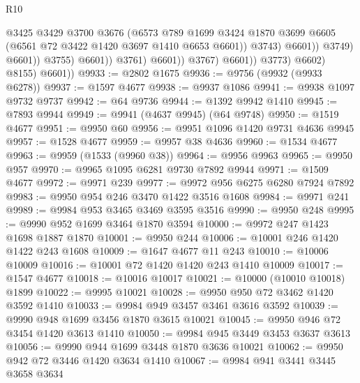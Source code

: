 \begin{lexlean}{R10}
\begin{coremodule}
                                            @3425
                                            @3429
                                            @3700
                                            @3676
                                            (@6573
                                              @789
                                              @1699
                                              @3424
                                              @1870
                                              @3699
                                              @6605
                                              (@6561 @72 @3422 @1420 @3697 @1410 @6653 @6601))
                                            @3743)
                                          @6601))
                                      @3749)
                                    @6601))
                                @3755)
                              @6601))
                          @3761)
                        @6601))
                    @3767)
                  @6601))
              @3773)
            @6602)
          @8155)
        @6601))
@9933 := @2802 @1675
@9936 := @9756 (@9932 (@9933 @6278))
@9937 := @1597 @4677
@9938 := @9937 @1086
@9941 := @9938 @1097 @9732 @9737
@9942 := @64 @9736
@9944 := @1392 @9942 @1410
@9945 := @7893 @9944
@9949 := @9941 (@4637 @9945) (@64 @9748)
@9950 := @1519 @4677
@9951 := @9950 @60
@9956 := @9951 @1096 @1420 @9731 @4636 @9945
@9957 := @1528 @4677
@9959 := @9957 @38 @4636
@9960 := @1534 @4677
@9963 := @9959 (@1533 (@9960 @38))
@9964 := @9956 @9963
@9965 := @9950 @957
@9970 := @9965 @1095 @6281 @9730 @7892 @9944
@9971 := @1509 @4677
@9972 := @9971 @239
@9977 := @9972 @956 @6275 @6280 @7924 @7892
@9983 := @9950 @954 @246 @3470 @1422 @3516 @1608
@9984 := @9971 @241
@9989 := @9984 @953 @3465 @3469 @3595 @3516
@9990 := @9950 @248
@9995 := @9990 @952 @1699 @3464 @1870 @3594
@10000 := @9972 @247 @1423 @1698 @1887 @1870
@10001 := @9950 @244
@10006 := @10001 @246 @1420 @1422 @243 @1608
@10009 := @1647 @4677 @11 @243
@10010 := @10006 @10009
@10016 := @10001 @72 @1420 @1420 @243 @1410 @10009
@10017 := @1547 @4677
@10018 := @10016 @10017
@10021 := @10000 (@10010 @10018) @1899
@10022 := @9995 @10021
@10028 := @9950 @950 @72 @3462 @1420 @3592 @1410
@10033 := @9984 @949 @3457 @3461 @3616 @3592
@10039 := @9990 @948 @1699 @3456 @1870 @3615 @10021
@10045 := @9950 @946 @72 @3454 @1420 @3613 @1410
@10050 := @9984 @945 @3449 @3453 @3637 @3613
@10056 := @9990 @944 @1699 @3448 @1870 @3636 @10021
@10062 := @9950 @942 @72 @3446 @1420 @3634 @1410
@10067 := @9984 @941 @3441 @3445 @3658 @3634

\end{coremodule}
\end{lexlean}
